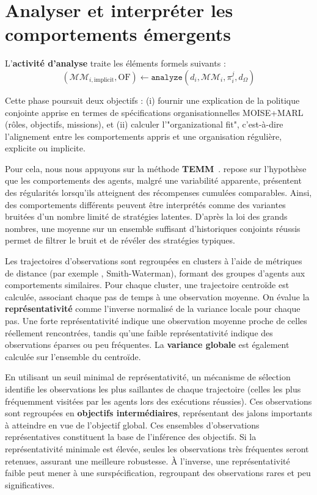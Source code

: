 \chapter{Analyser et interpréter les comportements émergents}
\label{chap:analyzing}

\noindent L'\textbf{activité d'analyse} traite les éléments formels suivants :
\[
    (\mathcal{MM}_{i,\text{implicit}}, \text{OF}) \gets \texttt{analyze}(d_i, \mathcal{MM}_i, \pi^j_i, d_\Omega)
\]

\noindent Cette phase poursuit deux objectifs : (i) fournir une explication de la politique conjointe apprise en termes de spécifications organisationnelles MOISE+MARL (rôles, objectifs, missions), et (ii) calculer l'"organizational fit", c'est-à-dire l'alignement entre les comportements appris et une organisation régulière, explicite ou implicite.

Pour cela, nous nous appuyons sur la méthode \textbf{TEMM}~\cite{soule2025moisemarl}.  repose sur l'hypothèse que les comportements des agents, malgré une variabilité apparente, présentent des régularités lorsqu'ils atteignent des récompenses cumulées comparables. Ainsi, des comportements différents peuvent être interprétés comme des variantes bruitées d'un nombre limité de stratégies latentes. D'après la loi des grands nombres, une moyenne sur un ensemble suffisant d'historiques conjoints réussis permet de filtrer le bruit et de révéler des stratégies typiques.

Les trajectoires d'observations sont regroupées en clusters à l'aide de métriques de distance (par exemple , Smith-Waterman), formant des groupes d'agents aux comportements similaires. Pour chaque cluster, une trajectoire centroïde est calculée, associant chaque pas de temps à une observation moyenne. On évalue la \textbf{représentativité} comme l'inverse normalisé de la variance locale pour chaque pas. Une forte représentativité indique une observation moyenne proche de celles réellement rencontrées, tandis qu'une faible représentativité indique des observations éparses ou peu fréquentes. La \textbf{variance globale} est également calculée sur l'ensemble du centroïde.

En utilisant un seuil minimal de représentativité, un mécanisme de sélection identifie les observations les plus saillantes de chaque trajectoire (celles les plus fréquemment visitées par les agents lors des exécutions réussies). Ces observations sont regroupées en \textbf{objectifs intermédiaires}, représentant des jalons importants à atteindre en vue de l'objectif global. Ces ensembles d'observations représentatives constituent la base de l'inférence des objectifs. Si la représentativité minimale est élevée, seules les observations très fréquentes seront retenues, assurant une meilleure robustesse. À l'inverse, une représentativité faible peut mener à une surspécification, regroupant des observations rares et peu significatives.

